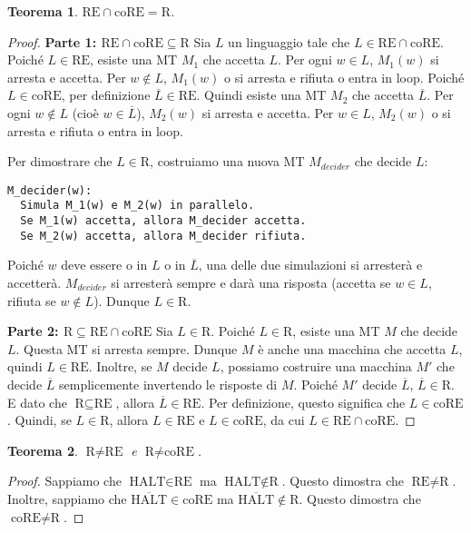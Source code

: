 \documentclass[a4paper]{article}
\newtheorem{theorem}{Teorema}
\begin{document}
\begin{theorem}
$\text{RE} \cap \text{coRE} = \text{R}$.
\end{theorem}
\begin{proof}
\textbf{Parte 1: $\text{RE} \cap \text{coRE} \subseteq \text{R}$}
Sia $L$ un linguaggio tale che $L \in \text{RE} \cap \text{coRE}$.
Poiché $L \in \text{RE}$, esiste una MT $M_1$ che accetta $L$. Per ogni $w \in L$, $M_1(w)$ si arresta e accetta. Per $w \notin L$, $M_1(w)$ o si arresta e rifiuta o entra in loop.
Poiché $L \in \text{coRE}$, per definizione $\overline{L} \in \text{RE}$. Quindi esiste una MT $M_2$ che accetta $\overline{L}$. Per ogni $w \notin L$ (cioè $w \in \overline{L}$), $M_2(w)$ si arresta e accetta. Per $w \in L$, $M_2(w)$ o si arresta e rifiuta o entra in loop.

Per dimostrare che $L \in \text{R}$, costruiamo una nuova MT $M_{decider}$ che decide $L$:
\begin{verbatim}
M_decider(w):
  Simula M_1(w) e M_2(w) in parallelo.
  Se M_1(w) accetta, allora M_decider accetta.
  Se M_2(w) accetta, allora M_decider rifiuta.
\end{verbatim}
Poiché $w$ deve essere o in $L$ o in $\overline{L}$, una delle due simulazioni si arresterà e accetterà. $M_{decider}$ si arresterà sempre e darà una risposta (accetta se $w \in L$, rifiuta se $w \notin L$). Dunque $L \in \text{R}$.

\textbf{Parte 2: $\text{R} \subseteq \text{RE} \cap \text{coRE}$}
Sia $L \in \text{R}$.
Poiché $L \in \text{R}$, esiste una MT $M$ che decide $L$. Questa MT si arresta sempre. Dunque $M$ è anche una macchina che accetta $L$, quindi $L \in \text{RE}$.
Inoltre, se $M$ decide $L$, possiamo costruire una macchina $M'$ che decide $\overline{L}$ semplicemente invertendo le risposte di $M$. Poiché $M'$ decide $\overline{L}$, $\overline{L} \in \text{R}$. E dato che $\text{R} \subseteq \text{RE}$, allora $\overline{L} \in \text{RE}$. Per definizione, questo significa che $L \in \text{coRE}$.
Quindi, se $L \in \text{R}$, allora $L \in \text{RE}$ e $L \in \text{coRE}$, da cui $L \in \text{RE} \cap \text{coRE}$.
\end{proof}

\begin{theorem}
$\text{R} \neq \text{RE}$ e $\text{R} \neq \text{coRE}$.
\end{theorem}
\begin{proof}
Sappiamo che $\text{HALT} \in \text{RE}$ ma $\text{HALT} \notin \text{R}$. Questo dimostra che $\text{RE} \neq \text{R}$.
Inoltre, sappiamo che $\overline{\text{HALT}} \in \text{coRE}$ ma $\overline{\text{HALT}} \notin \text{R}$. Questo dimostra che $\text{coRE} \neq \text{R}$.
\end{proof}
\end{document}
